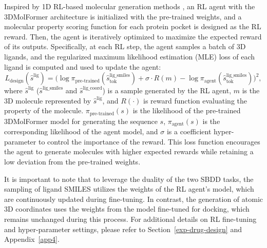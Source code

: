 Inspired by 1D RL-based molecular generation methods \citep{Reinvent}, an RL agent with the 3DMolFormer architecture is initialized with the pre-trained weights, and a molecular property scoring function for each protein pocket is designed as the RL reward. Then, the agent is iteratively optimized to maximize the expected reward of its outputs. Specifically, at each RL step, the agent samples a batch of 3D ligands, and the regularized maximum likelihood estimation (MLE) loss \citep{SMILES_RL} of each ligand is computed and used to update the agent:
\begin{equation}
\label{RLloss}
L_{\mathrm{design}}(\hat{s}^\mathrm{lig})=\big(\log\pi_\text{pre-trained}(\hat{s}_\mathrm{tok}^\mathrm{lig\_smiles})+\sigma\cdot R(m)-\log\pi_\text{agent}(\hat{s}_\mathrm{tok}^\mathrm{lig\_smiles})\big)^2,
\end{equation}
where $\hat{s}^\mathrm{lig}$ ($\hat{s}^\mathrm{lig\_smiles}$ and $\hat{s}^\mathrm{lig\_coord}$) is a sample generated by the RL agent, $m$ is the 3D molecule represented by $\hat{s}^\mathrm{lig}$, and $R(\cdot)$ is reward function evaluating the property of the molecule. $\pi_\text{pre-trained}(s)$ is the likelihood of the pre-trained 3DMolFormer model for generating the sequence $s$, $\pi_\text{agent}(s)$ is the corresponding likelihood of the agent model, and $\sigma$ is a coefficient hyper-parameter to control the importance of the reward. This loss function encourages the agent to generate molecules with higher expected rewards while retaining a low deviation from the pre-trained weights.

It is important to note that to leverage the duality of the two SBDD tasks, the sampling of ligand SMILES utilizes the weights of the RL agent's model, which are continuously updated during fine-tuning. In contrast, the generation of atomic 3D coordinates uses the weights from the model fine-tuned for docking, which remains unchanged during this process. For additional details on RL fine-tuning and hyper-parameter settings, please refer to Section~\ref{exp-drug-design} and Appendix~\ref{app4}.
